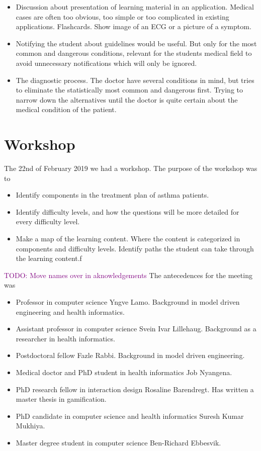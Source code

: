 \begin{itemize}
	\item Discussion about presentation of learning material in an application. Medical cases are often too obvious, too simple or too complicated in existing applications. Flashcards. Show image of an ECG or a picture of a symptom.
	\item Notifying the student about guidelines would be useful. But only for the most common and dangerous conditions, relevant for the students medical field to avoid unnecessary notifications which will only be ignored.
\item The diagnostic process. The doctor have several conditions in mind, but tries to eliminate the statistically most common and dangerous first. Trying to narrow down the alternatives until the doctor is quite certain about the medical condition of the patient.
	
\end{itemize}


\section{Workshop}
The 22nd of February 2019 we had a workshop. The purpose of the workshop was to
\begin{itemize}
	\item Identify components in the treatment plan of asthma patients.
	\item Identify difficulty levels, and how the questions will be more detailed for every difficulty level.
	\item Make a map of the learning content. Where the content is categorized in components and difficulty levels.  Identify paths the student can take through the learning content.f 
\end{itemize}

\textcolor{purple}{TODO: Move names over in aknowledgements}
The antecedences for the meeting was 
\begin{itemize}
	\item Professor in computer science Yngve Lamo. Background in model driven engineering and health informatics.
	\item Assistant professor in computer science Svein Ivar Lillehaug. Background as a researcher in health informatics.
	\item Postdoctoral fellow Fazle Rabbi. Background in model driven engineering.
	\item Medical doctor and PhD student in health informatics Job Nyangena.
	\item PhD research fellow in interaction design Rosaline Barendregt. Has written a master thesis in gamification.
	\item PhD candidate in computer science and health informatics Suresh Kumar Mukhiya.
	\item Master degree student in computer science Ben-Richard Ebbesvik.	
\end{itemize}

